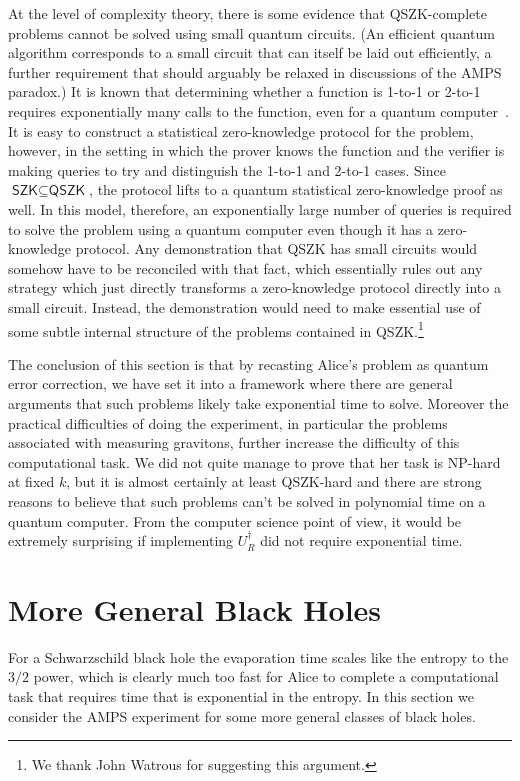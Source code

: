 \documentclass[12pt]{article}
\newcommand{\textcs}[1]{\textsf{#1}}
\newcommand{\NP}{\textcs{NP}}
\begin{document}
At the level of complexity theory, there is some evidence that \textcs{QSZK}-complete problems cannot be solved using small quantum circuits. (An efficient quantum algorithm corresponds to a small circuit that can itself be laid out efficiently, a further requirement that should arguably be relaxed in discussions of the AMPS paradox.) It is known that determining whether a function is 1-to-1 or 2-to-1 requires exponentially many calls to the function, even for a quantum computer~\cite{aaronson2002quantum}. It is easy to construct a statistical zero-knowledge protocol for the problem, however, in the setting in which the prover knows the function and the verifier is making queries to try and distinguish the 1-to-1 and 2-to-1 cases. Since $\textcs{SZK} \subseteq \textcs{QSZK}$, the protocol lifts to a quantum statistical zero-knowledge proof as well. In this model, therefore, an exponentially large number of queries is required to solve the problem using a quantum computer even though it has a zero-knowledge protocol. Any demonstration that \textcs{QSZK} has small circuits would somehow have to be reconciled with that fact, which essentially rules out any strategy which just directly transforms a zero-knowledge protocol directly into a small circuit. Instead, the demonstration would need to make essential use of some subtle internal structure of the problems contained in \textcs{QSZK}.\footnote{We thank John Watrous for suggesting this argument.}


The conclusion of this section is that by recasting Alice's problem as quantum error correction, we have set it into a framework where there are general arguments that such problems likely take exponential time to solve.  Moreover the practical difficulties of doing the experiment, in particular the problems associated with measuring gravitons, further increase the difficulty of this computational task.  We did not quite manage to prove that her task is {\NP}-hard at fixed $k$, but it is almost certainly at least \textcs{QSZK}-hard and there are strong reasons to believe that such problems can't be solved in polynomial time on a quantum computer.
From the computer science point of view, it would be extremely surprising if implementing $U_R^\dagger$ did not require exponential time.

\section{More General Black Holes}\label{adssect}
For a Schwarzschild black hole the evaporation time scales like the entropy to the $3/2$ power, which is clearly much too fast for Alice to complete a computational task that requires time that is exponential in the entropy.  In this section we consider the AMPS experiment for some more general classes of black holes.
\end{document}
